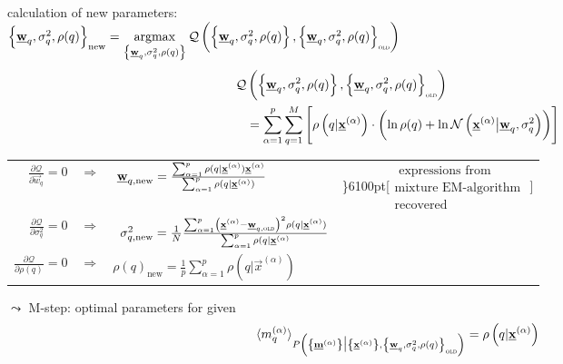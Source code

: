 	
calculation of new parameters:\\
 $\left\{ \vec{w}_q, \sigma_q^2, \rho(q) \right\}_{\text{new}} = \argmax\limits_{\left\{ \vec{w}_q, \sigma_q^2, \rho(q) \right\}} \mathcal{Q}  \left(  \left\{ \vec{w}_q, \sigma_q^2, \rho(q) \right\}, \left\{ \vec{w}_q, \sigma_q^2, \rho(q) \right\}_{\OLD} \right)$\\
\begin{align*}
\mathcal{Q}  &\left(  \left\{ \vec{w}_q, \sigma_q^2, \rho(q) \right\}, \left\{ \vec{w}_q, \sigma_q^2, \rho(q) \right\}_{\OLD} \right) 
\\&= \sum_{\alpha=1}^{p} \sum_{q=1}^{M} \left[ \rho \left( q | \vec{x}^{(\alpha)} \right) \cdot \left(  \ln \rho(q) + \ln \mathcal{N}\left( \vec{x}^{(\alpha)} \big| \vec{w}_q, \sigma_q^2 \right) \right)  \right]
\end{align*}
\newpage
\begin{table}
	\begin{tabular}{rlc}
		$\frac{\partial \mathcal{Q}}{\partial \vec{w}_q} = 0 \quad \Rightarrow$ & $\hspace{1mm} \vec{w}_{q,\text{new}} = \frac{\sum_{\alpha=1}^{p} \rho(q | \vec{x}^{(\alpha)}) \vec{x}^{(\alpha)} }{\sum_{\alpha=1}^{p} \rho(q | \vec{x}^{(\alpha)}) }$ & \rdelim\}{6}{100pt}[$\substack{\text{ expressions from}\\\text{mixture EM-algorithm}\\ \text{recovered}}$ ]  \\[10pt]               
		$\frac{\partial \mathcal{Q}}{\partial \sigma_q^2} = 0 \quad \Rightarrow$ & $\hspace{0.2cm} \sigma_{q,\text{new}}^2 = \frac{1}{N} \frac{\sum_{\alpha=1}^{p} \left( \vec{x}^{(\alpha)} -  \vec{w}_{q,\OLD} \right)^2 \rho(q | \vec{x}^{(\alpha)} )  }{ \sum_{\alpha=1}^{p}  \rho(q | \vec{x}^{(\alpha)}} $ &                         \\[14pt]              
		$\frac{\partial \mathcal{Q}}{\partial \rho(q)} = 0 \quad \Rightarrow$ & $\rho(q)_{\text{new}} = \frac{1}{p} \sum_{\alpha=1}^{p} \rho(q | \vec{x}^{(\alpha)})$ &                         \\[5pt]                
	\end{tabular}
\end{table}
$\leadsto$ M-step: optimal parameters for given 
\begin{equation*}
\langle m_q^{(\alpha)} \rangle_{ P \left( \left\{ \vec{m}^{(\alpha)} \right\} \big| \left\{ \vec{x}^{(\alpha)} \right\}, \left\{ \vec{w}_q, \sigma_q^2, \rho(q) \right\}_\OLD \right) } = \rho \left( q | \vec{x}^{(\alpha)} \right)
\end{equation*}
 